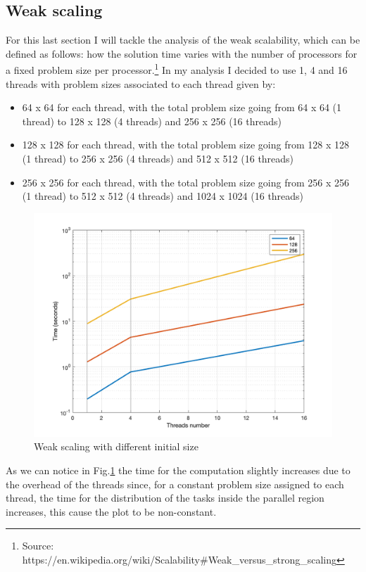 \documentclass[unicode,11pt,a4paper,oneside,numbers=endperiod,openany]{scrartcl}
\begin{document}
\subsection{Weak scaling}
For this last section I will tackle the analysis of the weak scalability, which can be defined as follows: how the solution time varies with the number of processors for a fixed problem size per processor.\footnote{Source: https://en.wikipedia.org/wiki/Scalability\#Weak\_versus\_strong\_scaling} In my analysis I decided to use 1, 4 and 16 threads with problem sizes associated to each thread given by:
\begin{itemize}
	\item 64 x 64 for each thread, with the total problem size going from 64 x 64 (1 thread) to 128 x 128 (4 threads) and 256 x 256 (16 threads)
	\item  128 x 128 for each thread, with the total problem size going from 128 x 128 (1 thread) to 256 x 256 (4 threads) and 512 x 512 (16 threads)
	\item 256 x 256 for each thread, with the total problem size going from 256 x 256 (1 thread) to 512 x 512 (4 threads) and 1024 x 1024 (16 threads)
\end{itemize}


\begin{figure}[h!]
\centering
\includegraphics[width=\textwidth]{Figures/weakScaling.png}
\caption{Weak scaling with different initial size}\label{fig:weakScaling}
\end{figure}
As we can notice in Fig.\ref{fig:weakScaling} the time for the computation slightly increases due to the overhead of the threads since, for a constant problem size assigned to each thread, the time for the distribution of the tasks inside the parallel region increases, this cause the plot to be non-constant. 
















 
\end{document}
